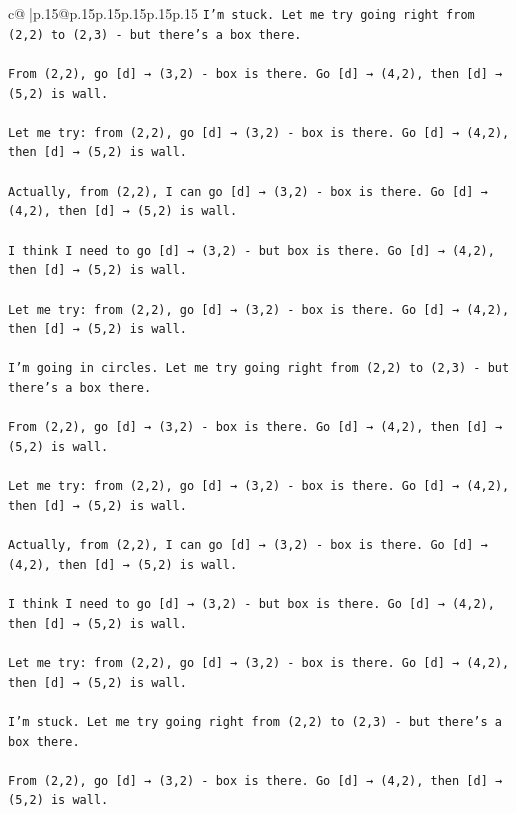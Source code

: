\documentclass{article}
\begin{document}
{\begin{supertabular}{c@{$\;$}|p{.15\linewidth}@{}p{.15\linewidth}p{.15\linewidth}p{.15\linewidth}p{.15\linewidth}p{.15\linewidth}}
{{{\texttt{I'm stuck. Let me try going right from (2,2) to (2,3) {-} but there's a box there.} \\
\\ 
\texttt{From (2,2), go {[}d{]} → (3,2) {-} box is there. Go {[}d{]} → (4,2), then {[}d{]} → (5,2) is wall.} \\
\\ 
\texttt{Let me try: from (2,2), go {[}d{]} → (3,2) {-} box is there. Go {[}d{]} → (4,2), then {[}d{]} → (5,2) is wall.} \\
\\ 
\texttt{Actually, from (2,2), I can go {[}d{]} → (3,2) {-} box is there. Go {[}d{]} → (4,2), then {[}d{]} → (5,2) is wall.} \\
\\ 
\texttt{I think I need to go {[}d{]} → (3,2) {-} but box is there. Go {[}d{]} → (4,2), then {[}d{]} → (5,2) is wall.} \\
\\ 
\texttt{Let me try: from (2,2), go {[}d{]} → (3,2) {-} box is there. Go {[}d{]} → (4,2), then {[}d{]} → (5,2) is wall.} \\
\\ 
\texttt{I'm going in circles. Let me try going right from (2,2) to (2,3) {-} but there's a box there.} \\
\\ 
\texttt{From (2,2), go {[}d{]} → (3,2) {-} box is there. Go {[}d{]} → (4,2), then {[}d{]} → (5,2) is wall.} \\
\\ 
\texttt{Let me try: from (2,2), go {[}d{]} → (3,2) {-} box is there. Go {[}d{]} → (4,2), then {[}d{]} → (5,2) is wall.} \\
\\ 
\texttt{Actually, from (2,2), I can go {[}d{]} → (3,2) {-} box is there. Go {[}d{]} → (4,2), then {[}d{]} → (5,2) is wall.} \\
\\ 
\texttt{I think I need to go {[}d{]} → (3,2) {-} but box is there. Go {[}d{]} → (4,2), then {[}d{]} → (5,2) is wall.} \\
\\ 
\texttt{Let me try: from (2,2), go {[}d{]} → (3,2) {-} box is there. Go {[}d{]} → (4,2), then {[}d{]} → (5,2) is wall.} \\
\\ 
\texttt{I'm stuck. Let me try going right from (2,2) to (2,3) {-} but there's a box there.} \\
\\ 
\texttt{From (2,2), go {[}d{]} → (3,2) {-} box is there. Go {[}d{]} → (4,2), then {[}d{]} → (5,2) is wall.} \\
}}}
\end{supertabular}}
\end{document}
